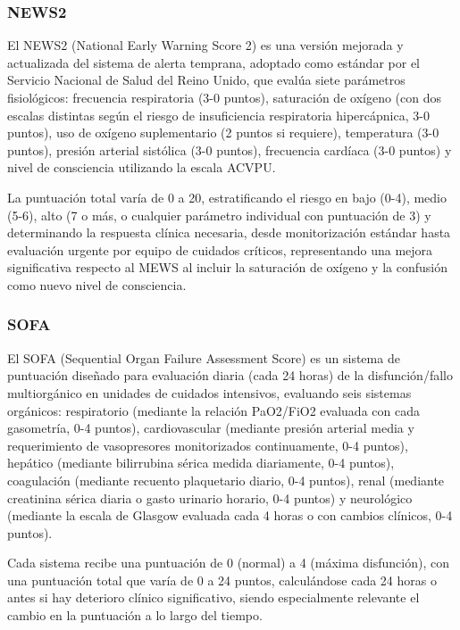 \subsubsection{NEWS2}
El NEWS2 (National Early Warning Score 2) es una versión mejorada y actualizada del sistema de alerta temprana, adoptado como estándar por el Servicio Nacional de Salud del Reino Unido, 
que evalúa siete parámetros fisiológicos: frecuencia respiratoria (3-0 puntos), saturación de oxígeno (con dos escalas distintas según el riesgo de insuficiencia respiratoria hipercápnica, 3-0 puntos), 
uso de oxígeno suplementario (2 puntos si requiere), temperatura (3-0 puntos), presión arterial sistólica (3-0 puntos), frecuencia cardíaca (3-0 puntos) 
y nivel de consciencia utilizando la escala ACVPU.\newline

La puntuación total varía de 0 a 20, estratificando el riesgo en bajo (0-4), medio (5-6), alto (7 o más, o cualquier parámetro individual con puntuación de 3) y determinando la respuesta clínica necesaria, 
desde monitorización estándar hasta evaluación urgente por equipo de cuidados críticos, representando una mejora significativa respecto al MEWS al incluir la saturación de oxígeno 
y la confusión como nuevo nivel de consciencia.

\newpage

\subsubsection{SOFA}
El SOFA (Sequential Organ Failure Assessment Score) es un sistema de puntuación diseñado para evaluación diaria (cada 24 horas) de la disfunción/fallo multiorgánico en unidades de cuidados intensivos, 
evaluando seis sistemas orgánicos: respiratorio (mediante la relación PaO2/FiO2 evaluada con cada gasometría, 0-4 puntos), 
cardiovascular (mediante presión arterial media y requerimiento de vasopresores monitorizados continuamente, 0-4 puntos), hepático (mediante bilirrubina sérica medida diariamente, 0-4 puntos), 
coagulación (mediante recuento plaquetario diario, 0-4 puntos), renal (mediante creatinina sérica diaria o gasto urinario horario, 0-4 puntos) 
y neurológico (mediante la escala de Glasgow evaluada cada 4 horas o con cambios clínicos, 0-4 puntos).\newline

Cada sistema recibe una puntuación de 0 (normal) a 4 (máxima disfunción), con una puntuación total que varía de 0 a 24 puntos, calculándose cada 24 horas o antes si hay deterioro clínico significativo, 
siendo especialmente relevante el cambio en la puntuación a lo largo del tiempo.

